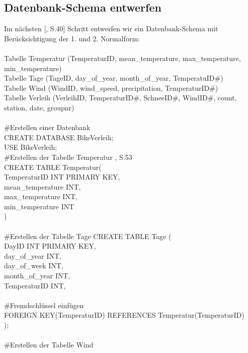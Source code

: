 \documentclass[1pt]{article}
\begin{document}
\newpage
\subsection{Datenbank-Schema entwerfen}
Im nächsten [\cite{SQLite}, S.40] Schritt entwerfen wir ein Datenbank-Schema mit Berücksichtigung der 1. und 2. 
Normalform:\\
\\
Tabelle Temperatur (TemperaturID, mean\_temperature, max\_temperature, min\_temperature)\\
Tabelle Tage (TageID, day\_of\_year, month\_of\_year, TemperatuID#)\\
Tabelle Wind (WindID, wind\_speed, precipitation, TemperaturID#)\\
Tabelle Verleih (VerleihID, TemperaturID#, SchneeID#, WindID#, count, station, date, groupnr)\\

\\ #Erstellen einer Datenbank\\
CREATE DATABASE BikeVerleih;\\
USE BikeVerleih;\\

 #Erstellen der Tabelle Temperatur \cite{SQLite}, S.53\\
CREATE TABLE Temperatur(\\ 
TemperaturID INT PRIMARY KEY,\\
mean\_temperature INT,\\
max\_temperature INT,\\
min\_temperature INT\\
)\\
\\
#Erstellen der Tabelle Tage 
CREATE TABLE Tage (\\
DayID INT PRIMARY KEY,\\
day\_of\_year INT,\\
day\_of\_week INT,\\
month\_of\_year  INT,\\
TemperaturID INT,\\
\\
#Fremdschlüssel einfügen\\
FOREIGN KEY(TemperaturID) REFERENCES Temperatur(TemperaturID)\\
);\\
\\
#Erstellen der Tabelle Wind\\
\end{document}
